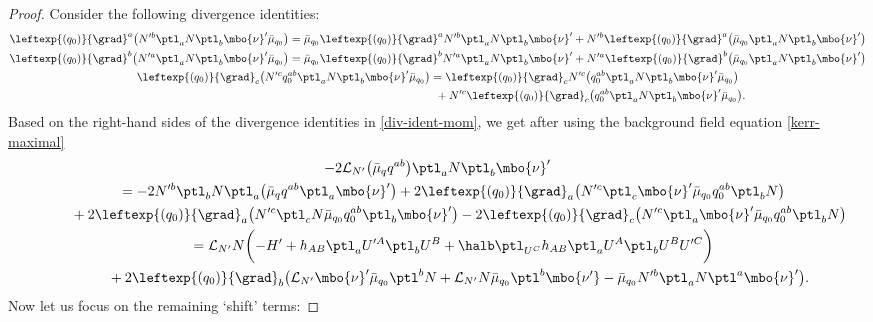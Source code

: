 \begin{proof}
Consider the following divergence identities:
\begin{subequations} \label{div-ident-mom}
\begin{gather}
\leftexp{(q_0)}{\grad}^a \bigl(N'^b \ptl_a N \ptl_b \mbo{\nu}' \bar{\mu}_{q_0}\bigr)= \bar{\mu}_{q_0} \leftexp{(q_0)}{\grad}^a N'^b \ptl_a N \ptl_b \mbo{\nu}' + N'^b \leftexp{(q_0)}{\grad}^a \bigl(\bar{\mu}_{q_0} \ptl_a N \ptl_b \mbo{\nu}'\bigr) \\
\leftexp{(q_0)}{\grad}^b \bigl(N'^a \ptl_a N \ptl_b \mbo{\nu}' \bar{\mu}_{q_0}\bigr)= \bar{\mu}_{q_0} \leftexp{(q_0)}{\grad}^b N'^a \ptl_a N \ptl_b \mbo{\nu}' + N'^a \leftexp{(q_0)}{\grad}^b \bigl(\bar{\mu}_{q_0} \ptl_a N \ptl_b \mbo{\nu}'\bigr) \\
\leftexp{(q_0)}{\grad}_c \bigl(N'^c q^{ab}_0 \ptl_a N \ptl_b \mbo{\nu}' \bar{\mu}_{q_0}\bigr)= \leftexp{(q_0)}{\grad}_c N'^c\bigl(q^{ab}_0 \ptl_a N \ptl_b \mbo{\nu}' \bar{\mu}_{q_0}\bigr)\nonumber\\ \hphantom{\leftexp{(q_0)}{\grad}_c \bigl(N'^c q^{ab}_0 \ptl_a N \ptl_b \mbo{\nu}' \bar{\mu}_{q_0}\bigr)=}{}
+ N'^c \leftexp{(q_0)}{\grad}_c \bigl(q^{ab}_0 \ptl_a N \ptl_b \mbo{\nu}' \bar{\mu}_{q_0}\bigr).
\end{gather}
\end{subequations}
Based on the right-hand sides of the divergence identities in \eqref{div-ident-mom}, we get after using the background field equation \eqref{kerr-maximal}
\begin{gather*}
-2 \mathcal{L}_{N'} \bigl(\bar{\mu}_q q^{ab}\bigr) \ptl_a N \ptl_b \mbo{\nu}' \notag\\
\qquad{}= -2 N'^b \ptl_b N \ptl_a \bigl(\bar{\mu}_q q^{ab} \ptl_a \mbo{\nu}'\bigr) + 2 \leftexp{(q_0)}{\grad}_a \bigl(N'^c \ptl_c \mbo{\nu}' \bar{\mu}_{q_0} q^{ab}_0 \ptl_b N\bigr) \notag\\
\qquad\quad{} + 2 \leftexp{(q_0)}{\grad}_a \bigl(N'^c \ptl_c N \bar{\mu}_{q_0} q^{ab}_0 \ptl_b \mbo{\nu}'\bigr) - 2 \leftexp{(q_0)}{\grad}_c \bigl(N'^c \ptl_a \mbo{\nu}' \bar{\mu}_{q_0} q^{ab}_0 \ptl_b N\bigr) \notag\\
\qquad{}= \mathcal{L}_{N'} N \biggl(- H' + h_{AB} \ptl_a U'^A \ptl_b U^B + \halb \ptl_{U^C} h_{AB} \ptl_a U^A \ptl_b U^B U'^C\biggr) \notag\\
\qquad\quad{} + 2 \leftexp{(q_0)}{\grad}_b \bigl(\mathcal{L}_{N'} \mbo{\nu}' \bar{\mu}_{q_0} \ptl^b N+ \mathcal{L}_{N'} N \bar{\mu}_{q_0} \ptl^b \mbo{\nu'} - \bar{\mu}_{q_0} N'^b \ptl_a N \ptl^a \mbo{\nu}'\bigr).
\end{gather*}
Now let us focus on the remaining `shift' terms:

\end{proof}
